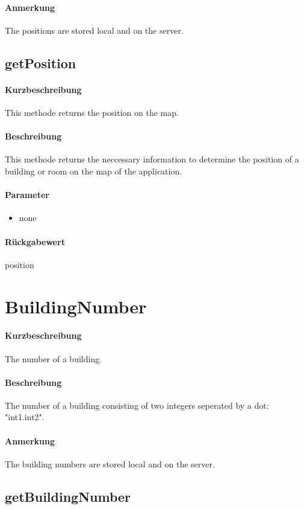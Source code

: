 \paragraph*{Anmerkung}
The positions are stored local and on the server.

\subsection{getPosition}%
\paragraph*{Kurzbeschreibung}
This methode returns the position on the map.
\paragraph*{Beschreibung}
This methode returns the neccessary information to determine the position of a building or room on the map of the application.
\paragraph*{Parameter}
\begin{itemize}
    \item none
\end{itemize}
\paragraph*{Rückgabewert}
position


\section{BuildingNumber}
\paragraph*{Kurzbeschreibung}
The number of a building.
\paragraph*{Beschreibung}
The number of a building consisting of two integers seperated by a dot: "int1.int2".
\paragraph*{Anmerkung}
The building numbers are stored local and on the server.

\subsection{getBuildingNumber}%
